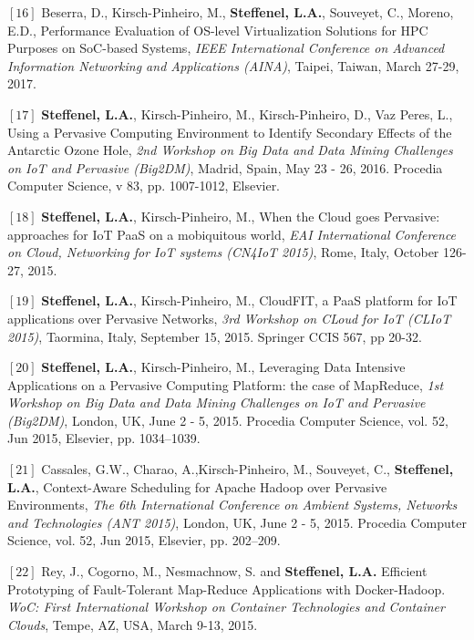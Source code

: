 \documentclass[final,twoside]{hdr} %
\begin{document}
\vspace{1em} \noindent $[16]$
Beserra, D., Kirsch-Pinheiro, M., {\bf Steffenel, L.A.}, Souveyet, C., Moreno, E.D., {Performance Evaluation of OS-level Virtualization Solutions for HPC Purposes on SoC-based Systems}, {\em IEEE International Conference on  Advanced Information Networking and Applications (AINA)}, Taipei, Taiwan, March 27-29, 2017.

\vspace{1em} \noindent $[17]$
{\bf Steffenel, L.A.}, Kirsch-Pinheiro, M., Kirsch-Pinheiro, D., Vaz Peres, L., {Using a Pervasive Computing Environment to Identify Secondary Effects of the Antarctic Ozone Hole}, {\em 2nd Workshop on Big Data and Data Mining Challenges on IoT and Pervasive (Big2DM)}, Madrid, Spain, May 23 - 26, 2016. Procedia Computer Science, v 83, pp. 1007-1012, Elsevier. 

\vspace{1em} \noindent $[18]$
{\bf Steffenel, L.A.}, Kirsch-Pinheiro, M.,  {When the Cloud goes Pervasive: approaches for IoT PaaS on a mobiquitous world},  {\em EAI International Conference on Cloud, Networking for IoT systems (CN4IoT 2015)}, Rome, Italy, October 126-27, 2015. 

\vspace{1em} \noindent $[19]$
{\bf Steffenel, L.A.}, Kirsch-Pinheiro, M.,  {CloudFIT, a PaaS platform for IoT applications over Pervasive Networks},  {\em 3rd Workshop on CLoud for IoT (CLIoT 2015)}, Taormina, Italy, September 15, 2015. Springer CCIS 567, pp 20-32.

\vspace{1em} \noindent $[20]$
{\bf Steffenel, L.A.}, Kirsch-Pinheiro, M.,  {Leveraging Data Intensive Applications on a Pervasive Computing Platform: the case of MapReduce}, {\em  1st Workshop on Big Data and Data Mining Challenges on IoT and Pervasive (Big2DM)}, London, UK, June 2 - 5, 2015. Procedia Computer Science, vol. 52, Jun 2015, Elsevier, pp. 1034–1039.  

\vspace{1em} \noindent $[21]$
Cassales, G.W., Charao, A.,Kirsch-Pinheiro, M., Souveyet, C., {\bf Steffenel, L.A.}, {Context-Aware Scheduling for Apache Hadoop over Pervasive Environments}, {\em The 6th International Conference on Ambient Systems, Networks and Technologies (ANT 2015)},  London, UK, June 2 - 5, 2015. Procedia Computer Science, vol. 52, Jun 2015, Elsevier, pp. 202–209.  

\vspace{1em} \noindent $[22]$
Rey, J., Cogorno, M., Nesmachnow, S. and {\bf Steffenel, L.A.} {Efficient Prototyping of Fault-Tolerant Map-Reduce Applications with Docker-Hadoop}. {\em WoC: First International Workshop on Container Technologies and Container Clouds},  Tempe, AZ, USA, March 9-13, 2015.
\end{document}
